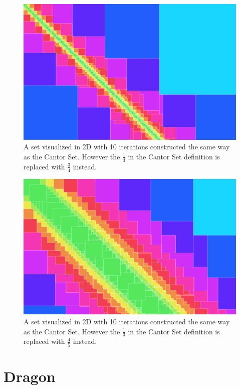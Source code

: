 \documentclass[11pt]{ekblite}
\begin{document}
	\begin{figure}[h]
		\includegraphics[scale=0.2]{img/c7.jpg}
		\caption{A set visualized in 2D with 10 iterations constructed the same way as the Cantor Set. However the $\frac{1}{3}$ in the Cantor Set definition is replaced with $\frac{3}{4}$ instead.}
	\end{figure}
	\begin{figure}[h]
		\includegraphics[scale=0.2]{img/c9.jpg}
		\caption{A set visualized in 2D with 10 iterations constructed the same way as the Cantor Set. However the $\frac{1}{3}$ in the Cantor Set definition is replaced with $\frac{4}{5}$ instead.}
	\end{figure}
\newpage
\section{Dragon}

\newpage

\end{document}
